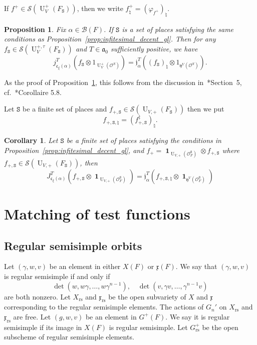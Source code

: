 \documentclass[letterpaper,11pt]{amsart}
\newcommand{\fa}{\mathfrak{a}}
\newcommand{\fc}{\mathfrak{c}}
\newcommand{\fx}{\mathfrak{x}}
\newcommand{\fy}{\mathfrak{y}}
\newcommand{\cB}{\mathcal{B}}
\newcommand{\cO}{\mathcal{O}}
\newcommand{\cS}{\mathcal{S}}
\newcommand{\tS}{\mathtt{S}}
\newcommand{\<}{\negthickspace}
\DeclareMathOperator{\U}{U}
\DeclareMathOperator{\id}{\mathbf{1}}
\DeclareMathOperator{\rs}{rs}
\theoremstyle{definition}
\theoremstyle{plain}
\newtheorem{prop}[definition]{Proposition}
\newtheorem{coro}[definition]{Corollary}
\theoremstyle{remark}
\numberwithin{equation}{section}
\begin{document}
If $f^+ \in \cS(\U_V^+(F_\tS))$, then we write $f^+_{\natural} =
(\varphi_{f^+})_{\natural}$.

\begin{prop} \label{prop:infitesimal_decent_u}
Fix $\alpha \in \cB(F)$. If $\tS$ is a set of places satisfying the same
conditions as Proposition~\ref{prop:infitesimal_decent_gl}. Then for any
$f_\tS \in \cS(\U_V^{+,\tau}(F_\tS))$ and $T \in \fa_0$ sufficiently
positive, we have
    \[
    j_{\fc_{\xi}(\alpha)}^T\left(f_\tS \otimes 1_{\U_V^+(\cO^S)}\right) =
    \mathfrak{j}_{\alpha}^T\left((f_{\tS})_{\natural}
    \otimes 1_{\fy^V(\cO^S)}\right).
    \]
\end{prop}

As the proof of Proposition~\ref{prop:infitesimal_decent_u}, this follows
from the discussion in~\cite{Zydor3}*{Section~5},
cf.~\cite{Zydor3}*{Corollaire 5.8}.




Let $\tS$ be a finite set of places and $f_{+, \tS} \in \cS(\U_{V,
+}(F_\tS))$ then we put
    \[
    f_{+, \tS, \natural} = \left( f_{+, \tS}^\ddag \right)_{\natural}.
    \]

\begin{coro}    \label{coro:infinite_descent_U}
Let $\tS$ be a finite set of places satisfying the conditions in
Proposition~\ref{prop:infitesimal_decent_gl}, and $f_+ =
\id_{\U_{V,+}(\cO_F^{\tS})} \otimes f_{+, \tS}$ where $f_{+, \tS} \in
\cS(\U_{V,+}(F_{\tS}))$, then
    \[
    J_{\fc_{\xi}(\alpha)}^T
    \left(f_{+, \tS} \otimes \id_{\U_{V,+}(\cO_F^\tS)}\right) =
    \mathfrak{j}_\alpha^T\left(f_{+, \tS, \natural}
    \otimes \id_{\fy^V(\cO_F^\tS)} \right)
    \]
\end{coro}








\section{Matching of test functions}
\label{sec:matching}


\subsection{Regular semisimple orbits}
Let $(\gamma, w, v)$ be an element in either $X(F)$ or $\fx(F)$. We say
that $(\gamma, w, v)$ is regular semisimple if and only if
    \[
    \det(w, w\gamma, \hdots, w \gamma^{n-1}),
    \quad \det(v, \gamma v, \hdots, \gamma^{n-1} v)
    \]
are both nonzero. Let $X_{\rs}$ and $\fx_{\rs}$ be the open subvariety
of $X$ and $\fx$ corresponding to the regular semisimple elements. The
actions of $G_n'$ on $X_{\rs}$ and $\fx_{\rs}$ are free. Let $(g, w,
v)$ be an element in $G^+(F)$. We say it is regular semisimple if its image
in $X(F)$ is regular semisimple. Let $G^+_{\rs}$ be the open subscheme of regular semisimple elements.
\end{document}
